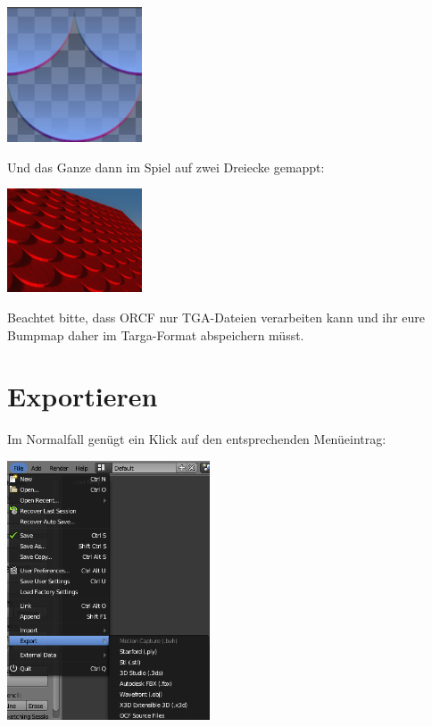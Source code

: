 \documentclass[a4paper]{article}
\begin{document}
\begin{center}
\includegraphics[width=40mm]{../images/blender/bumpmap.png}
\end{center}

Und das Ganze dann im Spiel auf zwei Dreiecke gemappt:
\begin{center}
\includegraphics[width=40mm]{../images/blender/bumpmap-ingame.png}
\end{center}

Beachtet bitte, dass ORCF nur TGA-Dateien verarbeiten kann und ihr eure Bumpmap daher im Targa-Format abspeichern müsst.

\section{Exportieren}
Im Normalfall genügt ein Klick auf den entsprechenden Menüeintrag:

\begin{center}
\includegraphics[width=60mm]{../images/blender/blender-menu.png}
\end{center}
\end{document}
